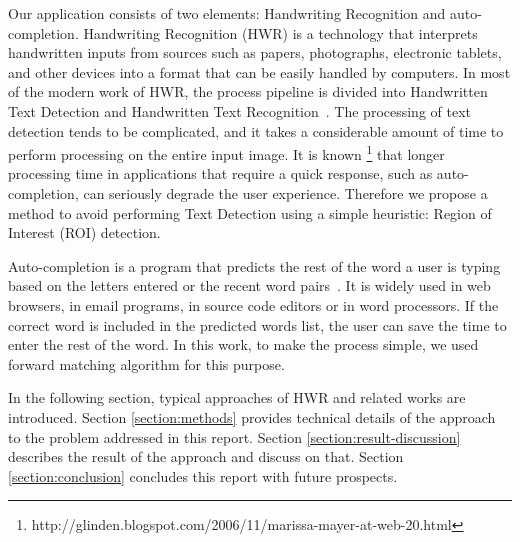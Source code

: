 Our application consists of two elements: Handwriting Recognition and auto-completion.
Handwriting Recognition (HWR) is a technology that
interprets handwritten inputs from sources such as papers,
photographs, electronic tablets, and other devices into a format
that can be easily handled by computers.
In most of the modern work of HWR, the process pipeline is divided into Handwritten Text Detection
and Handwritten Text Recognition~\cite{long2018scene}. The processing of text detection
tends to be complicated\cite{long2018scene}, and it takes a considerable amount of time to
perform processing on the entire input image. It is known
\footnote{http://glinden.blogspot.com/2006/11/marissa-mayer-at-web-20.html} that longer processing time
in applications that require a quick response, such as auto-completion,
can seriously degrade the user experience. Therefore we propose a method to avoid performing
Text Detection using a simple heuristic: Region of Interest (ROI) detection.

Auto-completion is a program that predicts the rest of the word a user is typing based on the letters entered
or the recent word pairs~\cite{darragh1990reactive}. It is widely used in web browsers, in email programs,
in source code editors or in word processors. If the correct word is included in the predicted words list,
the user can save the time to enter the rest of the word. In this work, to make the process simple,
we used forward matching algorithm for this purpose.

In the following section, typical approaches of HWR and related works are introduced.
Section \ref{section:methods} provides technical details of the approach to the problem addressed in
this report. Section \ref{section:result-discussion} describes the result of the approach and discuss on that.
Section \ref{section:conclusion} concludes this report with future prospects.
